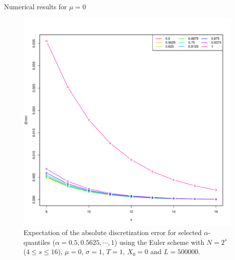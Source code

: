 \documentclass[cjk,10pt]{beamer}
\begin{document}
%

\begin{frame}{Numerical results for $\mu=0$}
\begin{figure}
   \includegraphics[scale=0.3]{nout_0a.pdf}
   \caption{Expectation of the absolute discretization error for selected $\alpha$-quantiles ($\alpha = 0.5, 0.5625, \cdots, 1$) using the Euler scheme with $N = 2^s$ ($4\le s \le 16$), $\mu=0$, $\sigma=1$, $T=1$, $X_0=0$ and $L=500000$. }
\label{f:ab}
\end{figure}
\end{frame}
\end{document}
